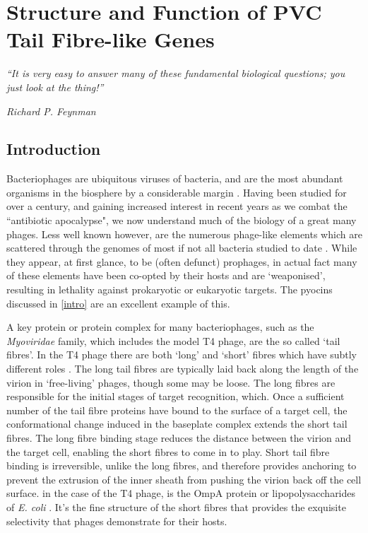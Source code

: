 \pagestyle{IHA-fancy-style}

\chapter{Structure and Function of PVC Tail Fibre-like Genes}\label{tailfibres}

\epigraph{\emph{``It is very easy to answer many of these fundamental biological questions; you just look at the thing!''}}{\textit{Richard P. Feynman}}


\section{Introduction}\label{tailfibreintro}
Bacteriophages are ubiquitous viruses of bacteria, and are the most abundant organisms in the biosphere by a considerable margin \citep{Clokie2011, Bartual2010}. Having been studied for over a century, and gaining increased interest in recent years as we combat the ``antibiotic apocalypse", we now understand much of the biology of a great many phages. Less well known however, are the numerous phage-like elements which are scattered through the genomes of most if not all bacteria studied to date \citep{Sarris2014}. While they appear, at first glance, to be (often defunct) prophages, in actual fact many of these elements have been co-opted by their hosts and are `weaponised', resulting in lethality against prokaryotic or eukaryotic targets. The pyocins discussed in \ref{intro} are an excellent example of this.

A key protein or protein complex for many bacteriophages, such as the \emph{Myoviridae} family, which includes the model T4 phage, are the so called `tail fibres'. In the T4 phage there are both `long' and `short' fibres which have subtly different roles \citep{Leiman2010}. The long tail fibres are typically laid back along the length of the virion in `free-living' phages, though some may be loose. The long fibres are responsible for the initial stages of target recognition, which. Once a sufficient number of the tail fibre proteins have bound to the surface of a target cell, the conformational change induced in the baseplate complex extends the short tail fibres. The long fibre binding stage reduces the distance between the virion and the target cell, enabling the short fibres to come in to play. Short tail fibre binding is irreversible, unlike the long fibres, and therefore provides anchoring to prevent the extrusion of the inner sheath from pushing the virion back off the cell surface.  in the case of the T4 phage, is the OmpA protein or lipopolysaccharides of \emph{E. coli} \citep{Granell2014, Taylor2016, Riede1987}. It's the fine structure of the short fibres that provides the exquisite selectivity that phages demonstrate for their hosts.

